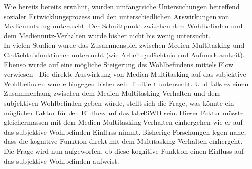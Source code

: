 Wie bereits  bereits erwähnt, wurden umfangreiche Untersuchungen betreffend sozialer Entwicklungsprozess und den unterschiedlichen Auswirkungen von Mediennutzung untersucht. Der Schnittpunkt zwischen dem Wohlbefinden und dem Mediennutz-Verhalten wurde bisher nicht bis wenig untersucht.\\ 
In vielen Studien wurde das Zusammenspiel zwischen Medien-Multitasking und Gedächtnisfunktionen untersucht (wie Arbeitsgedächtnis und Aufmerksamkeit). Ebenso wurde auf eine mögliche Steigerung des Wohlbefindens mittels Flow verwiesen \cite{Klingberg2008}. Die direkte Auswirkung von Medien-Multitasking auf das subjektive Wohlbefinden wurde hingegen bisher sehr limitiert untersucht. Und falls es einen Zusammenhang zwischen dem Medien-Multitasking-Verhalten und dem subjektiven Wohlbefinden geben würde, stellt sich die Frage, was könnte ein möglicher Faktor für den Einfluss auf das \gls{labelSWB} sein. Dieser Faktor müsste gleichermassen mit dem Medien-Multitasking-Verhalten einhergehen wie er auf das subjektive Wohlbefinden Einfluss nimmt. Bisherige Forschungen legen nahe, dass die kognitive Funktion direkt mit dem Multitasking-Verhalten einhergeht. Die Frage wird nun aufgeworfen, ob diese kognitive Funktion einen Einfluss auf das subjektive Wohlbefinden aufweist. 


